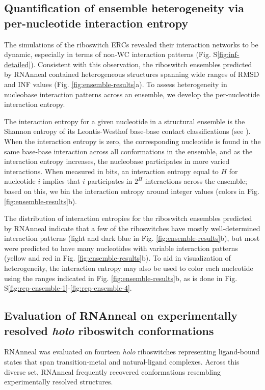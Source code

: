 \documentclass[%
aip,
 amsmath,amssymb,
reprint,%
twocolumn,
]{revtex4-1}
\begin{document}
{\subsection*{Quantification of ensemble heterogeneity via
per-nucleotide interaction entropy}

The simulations of the riboswitch ERCs revealed their interaction networks to be dynamic, especially in terms of non-WC interaction patterns (Fig. S\ref{fig:inf-detailed}). Consistent with this observation, the riboswitch ensembles predicted by RNAnneal contained heterogeneous structures spanning wide ranges of RMSD and INF values (Fig. \ref{fig:ensemble-results}a). To assess heterogeneity in nucleobase interaction patterns across an ensemble, we develop the per-nucleotide interaction entropy.

The interaction entropy for a given nucleotide in a structural ensemble is the Shannon entropy of its Leontis-Westhof base-base contact classifications (see ). When the interaction entropy is zero, the corresponding nucleotide is found in the same base-base interaction  across all conformations in the ensemble, and as the interaction entropy increases, the nucleobase participates in more varied interactions. When measured in bits, an interaction entropy equal to $H$ for nucleotide $i$ implies that $i$ participates in $2^H$ interactions across the ensemble; based on this, we bin the interaction entropy around integer values (colors in Fig. \ref{fig:ensemble-results}b).

The distribution of interaction entropies for the riboswitch ensembles predicted by RNAnneal indicate that a few of the riboswitches have mostly well-determined interaction patterns (light and dark blue in Fig. \ref{fig:ensemble-results}b), but most were predicted to have many nucleotides with variable interaction patterns (yellow and red in Fig. \ref{fig:ensemble-results}b). To aid in visualization of heterogeneity, the interaction entropy may also be used to color each nucleotide using the ranges indicated in Fig. \ref{fig:ensemble-results}b, as is done in Fig. S\ref{fig:rep-ensemble-1}-\ref{fig:rep-ensemble-4}.

\subsection*{Evaluation of RNAnneal on experimentally resolved \textrm{\textbf{\textit{holo}}}  riboswitch conformations}

RNAnneal was evaluated on fourteen {\it holo} riboswitches representing ligand-bound states that span transition-metal and natural-ligand complexes. Across this diverse set, RNAnneal frequently recovered conformations resembling experimentally resolved structures.

}
\end{document}
